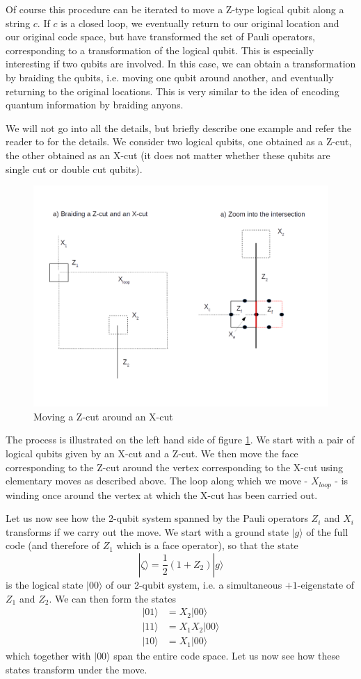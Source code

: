 \documentclass[a4paper, draft]{article}
\theoremstyle{own}
\theoremstyle{remark}
\begin{document}
Of course this procedure can be iterated to move a Z-type logical qubit along a string $c$. If $c$ is a closed loop, we eventually return to our original location and our original code space, but have transformed the set of Pauli operators, corresponding to a transformation of the logical qubit. This is especially interesting if two qubits are involved. In this case, we can obtain a transformation by braiding the qubits, i.e. moving one qubit around another, and eventually returning to the original locations. This is very similar to the idea of encoding quantum information by braiding anyons. 

We will not go into all the details, but briefly describe one example and refer the reader to \cite{SurfaceCodes} for the details. We consider two logical qubits, one obtained as a Z-cut, the other obtained as an X-cut (it does not matter whether these qubits are single cut or double cut qubits). 

\begin{figure}[ht]
\centering
\includegraphics[width=0.7\linewidth]{images/BraidingZXCut}
\caption[Moving a Z-cut around an X-cut]{Moving a Z-cut around an X-cut}
\label{fig:BraidingZXCut}
\end{figure}


The process is illustrated on the left hand side of figure \ref{fig:BraidingZXCut}. We start with a pair of logical qubits given by an X-cut and a Z-cut. We then move the face corresponding to the Z-cut around the vertex corresponding to the X-cut using elementary moves as described above. The loop along which we move - $X_{loop}$ - is winding once around the vertex at which the X-cut has been carried out. 

Let us now see how the 2-qubit system spanned by the Pauli operators $Z_i$ and $X_i$ transforms if we carry out the move. We start with a ground state $|g \rangle$ of the full code (and therefore of $Z_1$ which is a face operator), so that the state
$$
|\zeta \rangle = \frac{1}{2}(1 + Z_2) |g \rangle
$$
is the logical state $|00 \rangle$ of our 2-qubit system, i.e. a simultaneous $+1$-eigenstate of $Z_1$ and $Z_2$. We can then form the states
\begin{align*}
|01 \rangle &= X_2 |00 \rangle \\
|11 \rangle &= X_1 X_2 |00 \rangle \\
|10 \rangle &= X_1 |00 \rangle
\end{align*}
which together with $|00 \rangle$ span the entire code space. Let us now see how these states transform under the move.
\end{document}
